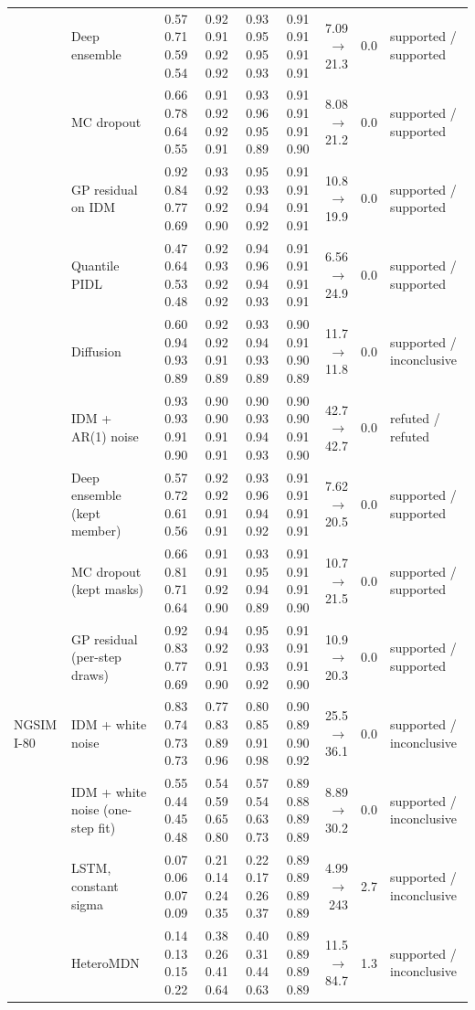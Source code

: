 \begin{longtable}{llrrrrrrl}
 & Deep ensemble & 0.57 0.71 0.59 0.54 & 0.92 0.91 0.92 0.92 & 0.93 0.95 0.95 0.93 & 0.91 0.91 0.91 0.91 & 7.09 $\rightarrow$ 21.3 & 0.0 & supported / supported \\
 & MC dropout & 0.66 0.78 0.64 0.55 & 0.91 0.92 0.92 0.91 & 0.93 0.96 0.95 0.89 & 0.91 0.91 0.91 0.90 & 8.08 $\rightarrow$ 21.2 & 0.0 & supported / supported \\
 & GP residual on IDM & 0.92 0.84 0.77 0.69 & 0.93 0.92 0.92 0.90 & 0.95 0.93 0.94 0.92 & 0.91 0.91 0.91 0.91 & 10.8 $\rightarrow$ 19.9 & 0.0 & supported / supported \\
 & Quantile PIDL & 0.47 0.64 0.53 0.48 & 0.92 0.93 0.92 0.92 & 0.94 0.96 0.94 0.93 & 0.91 0.91 0.91 0.91 & 6.56 $\rightarrow$ 24.9 & 0.0 & supported / supported \\
 & Diffusion & 0.60 0.94 0.93 0.89 & 0.92 0.92 0.91 0.89 & 0.93 0.94 0.93 0.89 & 0.90 0.91 0.90 0.89 & 11.7 $\rightarrow$ 11.8 & 0.0 & supported / inconclusive \\
 & IDM + AR(1) noise & 0.93 0.93 0.91 0.90 & 0.90 0.90 0.91 0.91 & 0.90 0.93 0.94 0.93 & 0.90 0.90 0.91 0.90 & 42.7 $\rightarrow$ 42.7 & 0.0 & refuted / refuted \\
 & Deep ensemble (kept member) & 0.57 0.72 0.61 0.56 & 0.92 0.92 0.91 0.91 & 0.93 0.96 0.94 0.92 & 0.91 0.91 0.91 0.91 & 7.62 $\rightarrow$ 20.5 & 0.0 & supported / supported \\
 & MC dropout (kept masks) & 0.66 0.81 0.71 0.64 & 0.91 0.91 0.92 0.90 & 0.93 0.95 0.94 0.89 & 0.91 0.91 0.91 0.90 & 10.7 $\rightarrow$ 21.5 & 0.0 & supported / supported \\
 & GP residual (per-step draws) & 0.92 0.83 0.77 0.69 & 0.94 0.92 0.91 0.90 & 0.95 0.93 0.93 0.92 & 0.91 0.91 0.91 0.90 & 10.9 $\rightarrow$ 20.3 & 0.0 & supported / supported \\
\midrule
NGSIM I-80 & IDM + white noise & 0.83 0.74 0.73 0.73 & 0.77 0.83 0.89 0.96 & 0.80 0.85 0.91 0.98 & 0.90 0.89 0.90 0.92 & 25.5 $\rightarrow$ 36.1 & 0.0 & supported / inconclusive \\
 & IDM + white noise (one-step fit) & 0.55 0.44 0.45 0.48 & 0.54 0.59 0.65 0.80 & 0.57 0.54 0.63 0.73 & 0.89 0.88 0.89 0.89 & 8.89 $\rightarrow$ 30.2 & 0.0 & supported / inconclusive \\
 & LSTM, constant sigma & 0.07 0.06 0.07 0.09 & 0.21 0.14 0.24 0.35 & 0.22 0.17 0.26 0.37 & 0.89 0.89 0.89 0.89 & 4.99 $\rightarrow$ 243 & 2.7 & supported / inconclusive \\
 & HeteroMDN & 0.14 0.13 0.15 0.22 & 0.38 0.26 0.41 0.64 & 0.40 0.31 0.44 0.63 & 0.89 0.89 0.89 0.89 & 11.5 $\rightarrow$ 84.7 & 1.3 & supported / inconclusive \\

\end{longtable}
